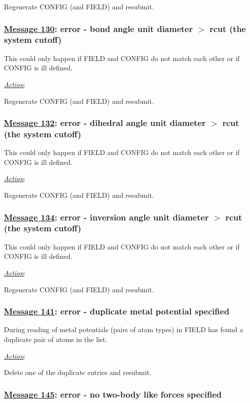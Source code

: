 Regenerate CONFIG (and FIELD) and resubmit.

\subsubsection*{\underline{Message 130}: error - bond angle unit diameter $>$ rcut (the system cutoff)}

This could only happen if FIELD and CONFIG do not match each other
or if CONFIG is ill defined.

\noindent \underline{\em Action}:

Regenerate CONFIG (and FIELD) and resubmit.

\subsubsection*{\underline{Message 132}: error - dihedral angle unit diameter $>$ rcut (the system cutoff)}

This could only happen if FIELD and CONFIG do not match each other
or if CONFIG is ill defined.

\noindent \underline{\em Action}:

Regenerate CONFIG (and FIELD) and resubmit.

\subsubsection*{\underline{Message 134}: error - inversion angle unit diameter $>$ rcut (the system cutoff)}

This could only happen if FIELD and CONFIG do not match each other
or if CONFIG is ill defined.

\noindent \underline{\em Action}:

Regenerate CONFIG (and FIELD) and resubmit.

\subsubsection*{\underline{Message 141}: error - duplicate metal potential specified}

During reading of metal potentials (pairs of atom types) in FIELD
\D has found a duplicate pair of atoms in the list.

\noindent \underline{\em Action}:

Delete one of the duplicate entries and resubmit.

\subsubsection*{\underline{Message 145}: error - no two-body like forces specified}

